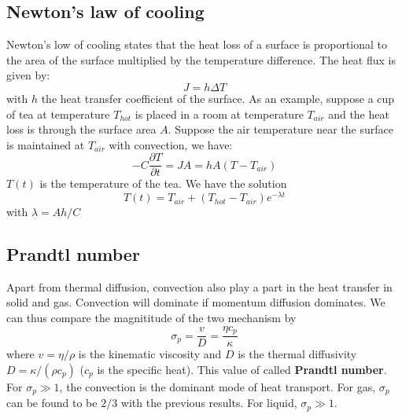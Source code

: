 \documentclass{article}
\begin{document}
\subsection*{Newton's law of cooling}
Newton's low of cooling states that the heat loss of a surface is proportional to the area of the surface
multiplied by the temperature difference. The heat flux is given by:
\begin{equation}
    J = h \Delta T
\end{equation}
with $h$ the heat transfer coefficient of the surface. As an example, suppose a cup of tea at temperature $T_{hot}$ 
is placed in a room at temperature $T_{air}$ and the heat loss is through the surface area $A$. Suppose the air temperature
near the surface is maintained at $T_{air}$ with convection, we have:
\begin{equation}
    -C \frac{\partial T}{\partial t} = J A  = h A (T - T_{air})
\end{equation}
$T(t)$ is the temperature of the tea. We have the solution
\begin{equation}
    T(t) = T_{air} + (T_{hot} - T_{air})e^{-\lambda t}
\end{equation}
with $\lambda = A h / C $

\subsection*{Prandtl number}
Apart from thermal diffusion, convection also play a part in the heat transfer in solid and gas. Convection will
dominate if momentum diffusion dominates. We can thus compare the magnititude of the two mechanism by
\begin{equation}
    \sigma_p = \frac{v}{D} = \frac{\eta c_p}{\kappa}
\end{equation}
where $v = \eta / \rho$ is the kinematic viscosity and $D$ is the thermal diffusivity $D = \kappa/(\rho c_p)$ ($c_p$ is the specific heat).
This value of called \textbf{Prandtl number}. For $\sigma_p \gg 1$, the convection is the dominant mode of heat transport. 
For gas, $\sigma_p$ can be found to be $2/3$ with the previous results. For liquid, $\sigma_p \gg 1$.
\end{document}
